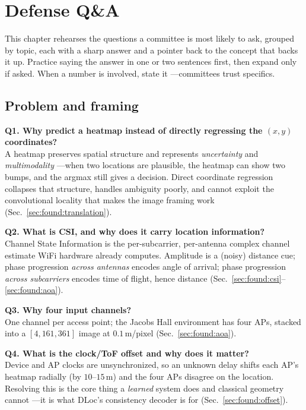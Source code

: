 \chapter{Defense Q\&A}
\label{ch:qa}

This chapter rehearses the questions a committee is most likely to ask, grouped by topic, each with a
sharp answer and a pointer back to the concept that backs it up. Practice saying the answer in one or
two sentences first, then expand only if asked. When a number is involved, state it ---committees trust
specifics.

\section{Problem and framing}
\label{sec:qa:framing}

\textbf{Q1. Why predict a heatmap instead of directly regressing the $(x,y)$ coordinates?}\\
A heatmap preserves spatial structure and represents \emph{uncertainty} and \emph{multimodality}
---when two locations are plausible, the heatmap can show two bumps, and the argmax still gives a
decision. Direct coordinate regression collapses that structure, handles ambiguity poorly, and cannot
exploit the convolutional locality that makes the image framing work (Sec.~\ref{sec:found:translation}).

\textbf{Q2. What is CSI, and why does it carry location information?}\\
Channel State Information is the per-subcarrier, per-antenna complex channel estimate WiFi hardware
already computes. Amplitude is a (noisy) distance cue; phase progression \emph{across antennas} encodes
angle of arrival; phase progression \emph{across subcarriers} encodes time of flight, hence distance
(Sec.~\ref{sec:found:csi}--\ref{sec:found:aoa}).

\textbf{Q3. Why four input channels?}\\
One channel per access point; the Jacobs Hall environment has four APs, stacked into a
$[4,161,361]$ image at $0.1$\,m/pixel (Sec.~\ref{sec:found:aoa}).

\textbf{Q4. What is the clock/ToF offset and why does it matter?}\\
Device and AP clocks are unsynchronized, so an unknown delay shifts each AP's heatmap radially (by
$10$--$15$\,m) and the four APs disagree on the location. Resolving this is the core thing a
\emph{learned} system does and classical geometry cannot ---it is what DLoc's consistency decoder is for
(Sec.~\ref{sec:found:offset}).

